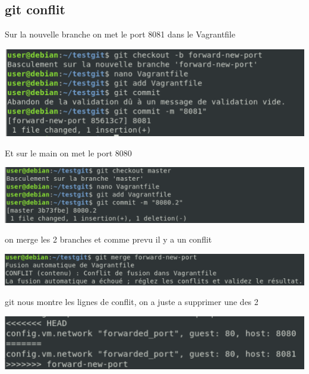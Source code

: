 \documentclass{article}
\begin{document}
 
 
 
 \subsection{\large{git conflit}}
 
 Sur la nouvelle branche on met le port 8081 dans le Vagrantfile
 
 \begin{center}
        \includegraphics[scale=0.5]{Images/8081.png}
 \end{center}
 
 Et sur le main on met le port 8080
 
 \begin{center}
        \includegraphics[scale=0.5]{Images/8080.png}
 \end{center}
 
 on merge les 2 branches et comme prevu il y a un conflit
 
 \begin{center}
        \includegraphics[scale=0.5]{Images/merge.png}
 \end{center}
 
 git nous montre les lignes de conflit, on a juste a supprimer une des 2
 
 \begin{center}
        \includegraphics[scale=0.5]{Images/conflit.png}
 \end{center}
 
\end{document}
